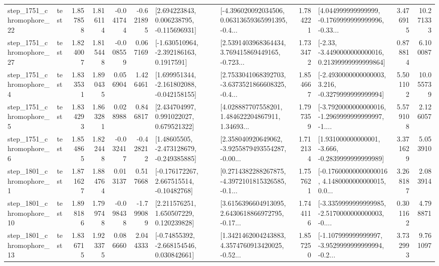 \begin{tabular}{llrrrrllrlrr}
 step\_1751\_chromophore\_22 &      test &      1.857858 &    1.816114 &     -0.041744 & -0.621895 &    [2.694223843, 0.006238795, -0.115696931] &  [-4.396020092034506, 0.06313659365991395, -0.4... &       1.784221 &  [4.044999999999999, -0.1769999999999996, -0.33... &            3.476915 &         10.271333 \\
 step\_1751\_chromophore\_27 &      test &      1.824007 &    1.815448 &     -0.008559 &  0.067169 &     [-1.630510964, -2.392186163, 0.1917591] &  [2.5391403968364434, 3.769415869449165, -0.723... &       1.733472 &  [-2.33, -3.4490000000000016, 0.21399999999999864] &            0.878814 &          6.100087 \\
  step\_1751\_chromophore\_4 &      test &      1.833531 &    1.890435 &      0.056904 &  1.426461 &   [1.699951344, -2.161802088, -0.042158155] &  [2.7533041068392703, -3.6373521866608325, -0.4... &       1.854667 &  [-2.4930000000000003, 3.216, -0.3279999999999994] &            5.501102 &         10.055739 \\
  step\_1751\_chromophore\_5 &      test &      1.834293 &    1.863281 &      0.028988 &  0.846817 &     [2.434704997, 0.991022027, 0.679521322] &  [4.028887707558201, 1.484622204867911, 1.34693... &       1.797359 &  [-3.7920000000000016, -1.2969999999999997, -1.... &            5.579108 &          2.126057 \\
  step\_1751\_chromophore\_6 &      test &      1.854865 &    1.822448 &     -0.032417 & -0.428212 &    [1.48605505, -2.473128679, -0.249385885] &  [2.358040920649062, -3.9255879493554287, -0.00... &       1.712134 &   [1.931000000000001, -3.666, -0.2839999999999989] &            3.371629 &          5.053910 \\
  step\_1801\_chromophore\_1 &      test &      1.871627 &    1.884764 &      0.013137 &  0.517668 &    [-0.176172267, 2.667515514, -0.10482768] &  [0.2714382288267875, -4.3972101815326585, -0.1... &       1.757621 &  [-0.17600000000000016, 4.1480000000000015, 0.0... &            3.268187 &          2.083914 \\
 step\_1801\_chromophore\_10 &      test &      1.898186 &    1.799748 &     -0.098438 & -1.799089 &     [2.211576251, 1.650507229, 0.120239828] &  [3.6156396604913095, 2.6430618866972795, -0.17... &       1.744116 &  [-3.3359999999999985, -2.5170000000000003, -0.... &            0.301162 &          4.798871 \\
 step\_1801\_chromophore\_13 &      test &      1.836715 &    1.923375 &      0.086660 &  2.044333 &    [-0.74855392, -2.668154546, 0.030842661] &  [1.3421462004243883, 4.3574760913420025, -0.52... &       1.857250 &  [-1.107999999999997, -3.9529999999999994, -0.2... &            3.732993 &          9.761097 \\

\end{tabular}
